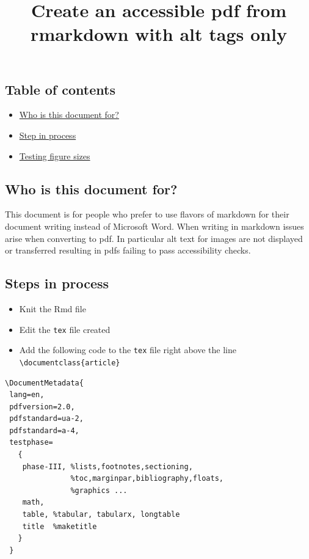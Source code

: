 \documentclass[
]{article}
\title{Create an accessible pdf from rmarkdown with alt tags only}
\author{}
\date{\vspace{-2.5em}}
\providecommand{\tightlist}{%
  \setlength{\itemsep}{0pt}\setlength{\parskip}{0pt}}
\begin{document}
\maketitle

\subsection{Table of contents}\label{table-of-contents}

\begin{itemize}
\tightlist
\item
  \hyperref[who-is-this-document-for]{Who is this document for?}
\item
  \hyperref[steps-in-process]{Step in process}
\item
  \hyperref[testing-figure-sizes]{Testing figure sizes}
\end{itemize}

\subsection{Who is this document for?}\label{who-is-this-document-for}

This document is for people who prefer to use flavors of markdown for
their document writing instead of Microsoft Word. When writing in
markdown issues arise when converting to pdf. In particular alt text for
images are not displayed or transferred resulting in pdfs failing to
pass accessibility checks.

\subsection{Steps in process}\label{steps-in-process}

\begin{itemize}
\tightlist
\item
  Knit the Rmd file
\item
  Edit the \texttt{tex} file created
\item
  Add the following code to the \texttt{tex} file right above the line
  \texttt{\textbackslash{}documentclass\{article\}}
\end{itemize}

\begin{verbatim}
\DocumentMetadata{
 lang=en,
 pdfversion=2.0,
 pdfstandard=ua-2,
 pdfstandard=a-4,
 testphase=
   {
    phase-III, %lists,footnotes,sectioning,
               %toc,marginpar,bibliography,floats,
               %graphics ...
    math,  
    table, %tabular, tabularx, longtable
    title  %maketitle
   }
 }
\end{verbatim}
\end{document}
